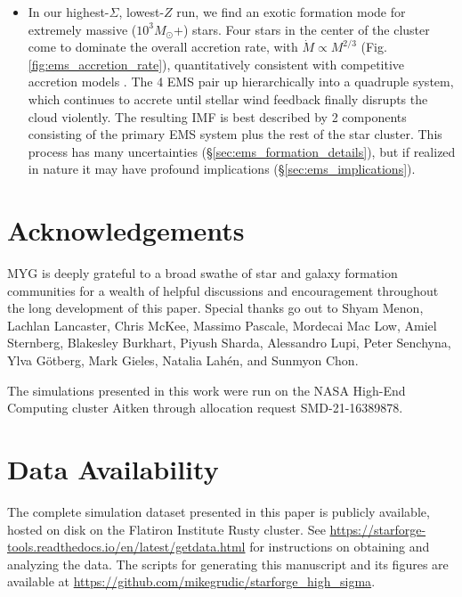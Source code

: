 \documentclass[apjl,twocolumn]{openjournal}
\begin{document}
\begin{itemize}
	\item In our highest-$\Sigma$, lowest-$Z$ run, we find an exotic formation mode for extremely massive ($10^3 M_\odot$+) stars. Four stars in the center of the cluster come to dominate the overall accretion rate, with $\dot{M} \propto M^{2/3}$ (Fig. \ref{fig:ems_accretion_rate}), quantitatively consistent with competitive accretion models \citep{bonnell:2001.competitive.accretion}. The 4 EMS pair up hierarchically into a quadruple system, which continues to accrete until stellar wind feedback finally disrupts the cloud violently. The resulting IMF is best described by 2 components consisting of the primary EMS system plus the rest of the star cluster. This process has many uncertainties (\S\ref{sec:ems_formation_details}), but if realized in nature it may have profound implications (\S\ref{sec:ems_implications}).
\end{itemize}
\section*{Acknowledgements}
MYG is deeply grateful to a broad swathe of star and galaxy formation communities for a wealth of helpful discussions and encouragement throughout the long development of this paper. Special thanks go out to Shyam Menon, Lachlan Lancaster, Chris McKee, Massimo Pascale, Mordecai Mac Low, Amiel Sternberg, Blakesley Burkhart, Piyush Sharda, Alessandro Lupi, Peter Senchyna, Ylva G\"{o}tberg, Mark Gieles, Natalia Lah\'{e}n, and Sunmyon Chon. 

The simulations presented in this work were run on the NASA High-End Computing cluster Aitken through allocation request SMD-21-16389878.

\section*{Data Availability}
The complete simulation dataset presented in this paper is publicly available, hosted on disk on the Flatiron Institute Rusty cluster. See \url{https://starforge-tools.readthedocs.io/en/latest/getdata.html} for instructions on obtaining and analyzing the data. The scripts for generating this manuscript and its figures are available at \url{https://github.com/mikegrudic/starforge_high_sigma}.

\clearpage
\appendix
\end{document}
